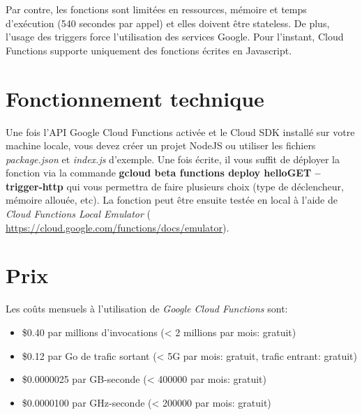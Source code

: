 \documentclass[a4paper, 11pt]{book}
\begin{document}
Par contre, les fonctions sont limitées en ressources, mémoire et temps d'exécution (540 secondes par appel) et elles doivent être stateless. De plus, l'usage des triggers force l'utilisation des services Google. Pour l'instant, Cloud Functions supporte uniquement des fonctions écrites en Javascript.

\section*{Fonctionnement technique}
Une fois l'API Google Cloud Functions activée et le Cloud SDK installé sur votre machine locale, vous devez créer un projet NodeJS ou utiliser les fichiers \textit{package.json} et \textit{index.js} d'exemple. Une fois écrite, il vous suffit de déployer la fonction via la commande \textbf{gcloud beta functions deploy helloGET --trigger-http} qui vous permettra de faire plusieurs choix (type de déclencheur, mémoire allouée, etc). La fonction peut être ensuite testée en local à l'aide de \textit{Cloud Functions Local Emulator} (\url{ https://cloud.google.com/functions/docs/emulator}).

\section*{Prix}
Les coûts mensuels à l'utilisation de \textit{Google Cloud Functions} sont:
\begin{itemize}
	\item \$0.40 par millions d'invocations (< 2 millions par mois: gratuit)
    \item \$0.12 par Go de trafic sortant (< 5G par mois: gratuit, trafic entrant: gratuit)
    \item \$0.0000025 par GB-seconde (< 400000 par mois: gratuit)
    \item \$0.0000100 par GHz-seconde (< 200000 par mois: gratuit)
\end{itemize}

\end{document}
